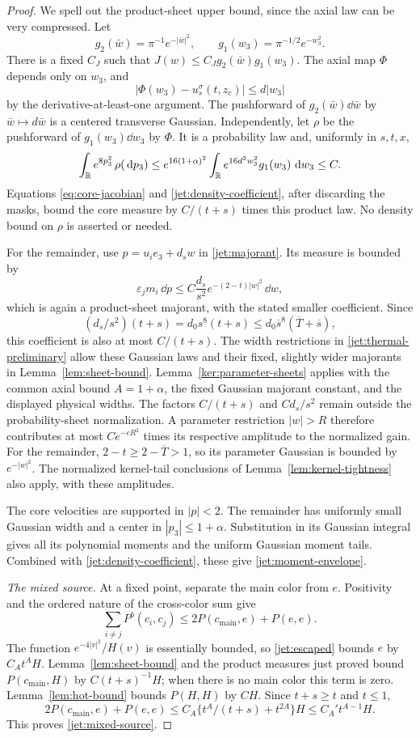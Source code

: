 \begin{proof}
We spell out the product-sheet upper bound, since the axial law
can be very compressed.  Let
\[
 g_2(\bar w)=\pi^{-1}e^{-|\bar w|^2},\qquad
 g_1(w_3)=\pi^{-1/2}e^{-w_3^2}.
\]
There is a fixed \(C_J\) such that \(J(w)\le C_Jg_2(\bar w)g_1(w_3)\).
The axial map \(\Phi\) depends only on \(w_3\), and
\[
 |\Phi(w_3)-u_s^\sigma(t,z_c)|\le d|w_3|
\]
by the derivative-at-least-one argument.
The pushforward of \(g_2(\bar w)\dd\bar w\) by
\(\bar w\mapsto d\bar w\) is a centered transverse Gaussian.
Independently, let \(\rho\) be the pushforward of
\(g_1(w_3)\dd w_3\) by \(\Phi\).
It is a probability law and, uniformly in \(s,t,x\),
\[
 \int_\mathbb R e^{8p_3^2}\,\rho(\,\mathrm d p_3)
 \le e^{16(1+\alpha)^2}
       \int_\mathbb R e^{16d^2w_3^2}g_1(w_3)\,\,\mathrm d w_3
 \le C.
\]
Equations \eqref{eq:core-jacobian} and
\eqref{jet:density-coefficient}, after discarding the masks,
bound the core measure by \(C/(t+s)\) times this product law.
No density bound on \(\rho\) is asserted or needed.

For the remainder, use \(p=u_i e_3+d_s w\) in
\eqref{jet:majorant}.  Its measure is bounded by
\[
 \varepsilon_jm_i\,\dd p
 \le C\frac{d_s}{s^2}e^{-(2-t)|w|^2}\,\dd w,
\]
which is again a product-sheet majorant, with the stated smaller
coefficient.  Since
\[
 (d_s/s^2)(t+s)=d_0s^8(t+s)
       \le d_0\overline s^8(\overline T+\overline s),
\]
this coefficient is also at most \(C/(t+s)\).
The width restrictions in \eqref{jet:thermal-preliminary} allow
these Gaussian laws and their fixed, slightly wider majorants
in Lemma~\ref{lem:sheet-bound}. Lemma~\ref{ker:parameter-sheets}
applies with the common axial bound \(A=1+\alpha\), the fixed
Gaussian majorant constant, and the displayed physical widths.
The factors \(C/(t+s)\) and \(Cd_s/s^2\) remain outside the
probability-sheet normalization. A parameter restriction \(|w|>R\)
therefore contributes at most \(Ce^{-cR^2}\) times its respective
amplitude to the normalized gain. For the remainder,
\(2-t\ge2-\overline T>1\), so its parameter Gaussian is bounded
by \(e^{-|w|^2}\). The normalized kernel-tail
conclusions of Lemma~\ref{lem:kernel-tightness} also apply, with
these amplitudes.

The core velocities are supported in \(|p|<2\).
The remainder has uniformly small Gaussian width and a center in
\(|p_3|\le1+\alpha\).  Substitution in its Gaussian integral gives
all its polynomial moments and the uniform Gaussian moment
tails.  Combined with \eqref{jet:density-coefficient}, these give
\eqref{jet:moment-envelope}.

\emph{The mixed source.}
At a fixed point, separate the main color from \(e\).  Positivity
and the ordered nature of the cross-color sum give
\[
 \sum_{i\ne j}P^b(c_i,c_j)
       \le 2P(c_{\mathrm{main}},e)+P(e,e).
\]
The function \(e^{-4|v|^2}/H(v)\) is essentially bounded, so
\eqref{jet:escaped} bounds \(e\) by \(C_A t^AH\).
Lemma~\ref{lem:sheet-bound} and the product measures just proved
bound \(P(c_{\mathrm{main}},H)\) by \(C(t+s)^{-1}H\);
when there is no main color this term is zero.
Lemma~\ref{lem:hot-bound} bounds \(P(H,H)\) by \(CH\).
Since \(t+s\ge t\) and \(t\le1\),
\[
 2P(c_{\mathrm{main}},e)+P(e,e)
 \le C_A\{t^A/(t+s)+t^{2A}\}H
 \le C_A' t^{A-1}H .
\]
This proves \eqref{jet:mixed-source}.
\end{proof}

